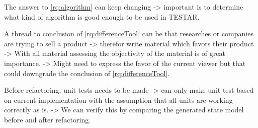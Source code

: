         The answer to \ref{rq:algorithm} can keep changing -> important is to determine what kind of algorithm is good enough to be used in TESTAR.
        
        A thread to conclusion of \ref{rq:differenceTool} can be that researches or companies are trying to sell a product -> therefor write material which favors their product -> With all material assessing the objectivity of the material is of great importance. -> Might need to express the favor of the current viewer \cite{thesisMulders} but that could downgrade the conclusion of \ref{rq:differenceTool}. 
        
        Before refactoring, unit tests needs to be made -> can only  make unit test based on current implementation with the assumption that all units are working correctly as is. -> We can verify this by comparing the generated state model before and after refactoring.